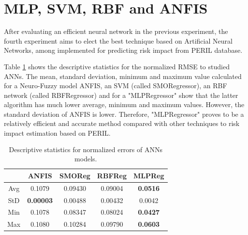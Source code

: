 \section{MLP, SVM, RBF and ANFIS}

After evaluating an efficient neural network in the previous experiment, the fourth experiment aims to elect the best technique based on Artificial Neural Networks, among implemented for predicting risk impact from PERIL database.

Table \ref{tab:anns_descriptive} shows the descriptive statistics for the normalized RMSE to studied ANNs. The mean, standard deviation, minimum and maximum value calculated for a Neuro-Fuzzy model ANFIS, an SVM (called SMORegressor), an RBF network (called RBFRegressor) and for a "MLPRegressor" show that the latter algorithm has much lower average, minimum and maximum values. However, the standard deviation of ANFIS is lower. Therefore, "MLPRegressor" proves to be a relatively efficient and accurate method compared with other techniques to risk impact estimation based on PERIL.

\begin{table}[h]
\caption{Descriptive statistics for normalized errors of ANNs models.}\label{tab:anns_descriptive} \centering
\begin{tabular}{|c|c|c|c|c|}
  \hline
   & ANFIS & SMOReg & RBFReg & MLPReg  \\
  \hline
  Avg & 0.1079 & 0.09430 & 0.09004 & \textbf{0.0516}   \\
  \hline
  StD & \textbf{0.00003} & 0.00488 & 0.00432 & 0.0042   \\
  \hline
  Min & 0.1078 & 0.08347 & 0.08024	 & \textbf{0.0427}   \\
  \hline
  Max & 0.1080 & 0.10284 & 0.09790 & \textbf{0.0603}   \\
  \hline
\end{tabular}
\end{table}

